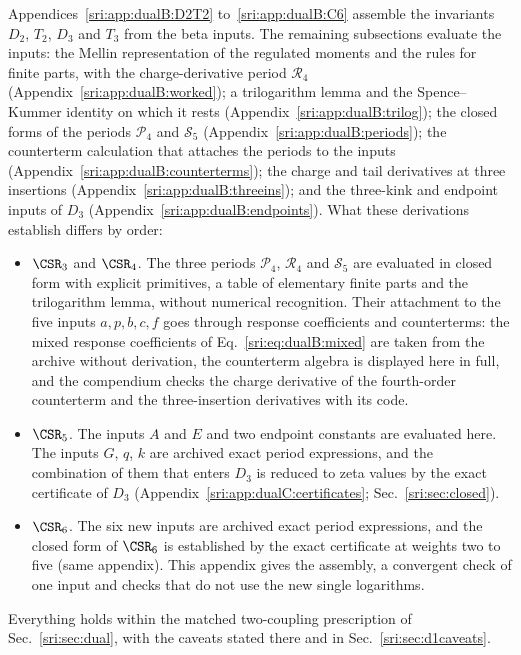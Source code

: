 Appendices~\ref{sri:app:dualB:D2T2} to~\ref{sri:app:dualB:C6} assemble the invariants $D_2$, $T_2$, $D_3$ and $T_3$ from the
beta inputs. The remaining subsections evaluate the inputs: the Mellin representation of the regulated moments and
the rules for finite parts, with the charge-derivative period $\mathcal R_4$ (Appendix~\ref{sri:app:dualB:worked}); a
trilogarithm lemma and the Spence--Kummer identity on which it rests (Appendix~\ref{sri:app:dualB:trilog}); the closed
forms of the periods $\mathcal P_4$ and $\mathcal S_5$ (Appendix~\ref{sri:app:dualB:periods}); the counterterm
calculation that attaches the periods to the inputs (Appendix~\ref{sri:app:dualB:counterterms}); the charge and tail
derivatives at three insertions (Appendix~\ref{sri:app:dualB:threeins}); and the three-kink and endpoint inputs of $D_3$
(Appendix~\ref{sri:app:dualB:endpoints}). What these derivations establish differs by order:
\begin{itemize}
\item $\CSR_3$ and $\CSR_4$. The three periods $\mathcal P_4$, $\mathcal R_4$ and $\mathcal S_5$ are evaluated in closed
 form with explicit primitives, a table of elementary finite parts and the trilogarithm lemma, without numerical
 recognition. Their attachment to the five inputs $a,p,b,c,f$ goes through response coefficients and counterterms:
 the mixed response coefficients of Eq.~\eqref{sri:eq:dualB:mixed} are taken from the archive without derivation, the
 counterterm algebra is displayed here in full, and the compendium checks the charge derivative of the fourth-order
 counterterm and the three-insertion derivatives with its code.
\item $\CSR_5$. The inputs $A$ and $E$ and two endpoint constants are evaluated here. The inputs $G$, $q$, $k$ are
 archived exact period expressions, and the combination of them that enters $D_3$ is reduced to zeta values by the
 exact certificate of $D_3$ (Appendix~\ref{sri:app:dualC:certificates}; Sec.~\ref{sri:sec:closed}).
\item $\CSR_6$. The six new inputs are archived exact period expressions, and the closed form of $\CSR_6$ is
 established by the exact certificate at weights two to five (same appendix). This appendix gives the assembly, a
 convergent check of one input and checks that do not use the new single logarithms.
\end{itemize}
Everything holds within the matched two-coupling prescription of Sec.~\ref{sri:sec:dual}, with the caveats stated there
and in Sec.~\ref{sri:sec:d1caveats}.

